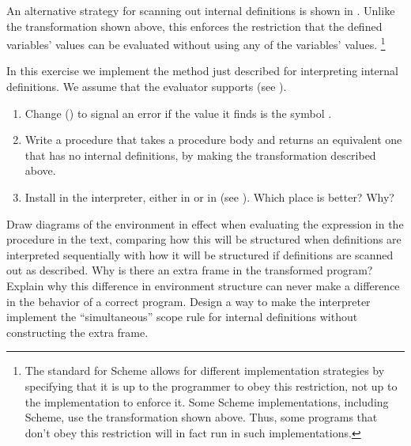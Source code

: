 An alternative strategy for scanning out internal definitions is shown in .
Unlike the transformation shown above, this enforces the restriction that the defined variables’ values can be evaluated without using any of the variables’ values.%
\footnote{
	The  standard for Scheme allows for different implementation strategies by specifying that it is up to the programmer to obey this restriction, not up to the implementation to enforce it.
	Some Scheme implementations, including  Scheme, use the transformation shown above.
	Thus, some programs that don’t obey this restriction will in fact run in such implementations.
}



\begin{exercise}
	\label{Exercise 4.16}
	In this exercise we implement the method just described for interpreting internal definitions.
	We assume that the evaluator supports  (see ).
	\begin{enumerate}[label = \alph*., leftmargin = *]

		\item
			Change  () to signal an error if the value it finds is the symbol .

		\item
			Write a procedure  that takes a procedure body and returns an equivalent one that has no internal definitions, by making the transformation described above.

		\item
			Install  in the interpreter, either in  or in  (see ).
			Which place is better?
			Why?

	\end{enumerate}
\end{exercise}



\begin{exercise}
	\label{Exercise 4.17}
	Draw diagrams of the environment in effect when evaluating the expression  in the procedure in the text, comparing how this will be structured when definitions are interpreted sequentially with how it will be structured if definitions are scanned out as described.
	Why is there an extra frame in the transformed program?
	Explain why this difference in environment structure can never make a difference in the behavior of a correct program.
	Design a way to make the interpreter implement the “simultaneous” scope rule for internal definitions without constructing the extra frame.
\end{exercise}



